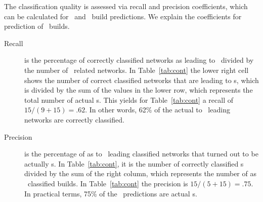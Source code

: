 The classification quality is assessed via recall and precision coefficients,
which can be calculated for \error\ and \ok\ build  predictions. We explain the
coefficients for prediction of \error\ builds.

\begin{description}
\item[Recall] is the percentage of correctly classified networks as leading to
\error\ divided by the number of \error\ related networks. In
Table~\ref{tab:cont} the lower right cell shows the number of correct classified
networks that are leading to \error s, which is divided by the sum of the values
in the lower row, which represents the total number of actual \error s. This
yields for Table~\ref{tab:cont} a recall of $15/(9+15)=.62$. In other words,
62\% of the actual to \error\ leading networks are correctly classified.
 
\item[Precision] is the percentage of as to \error\ leading classified networks
that turned out to be actually \error s. In Table~\ref{tab:cont}, it is the
number of correctly classified \error s divided by the sum of the right column,
which represents the number of as \error\ classified builds. In
Table~\ref{tab:cont} the precision is $15/(5+15)=.75$. In practical terms, 75\%
of the \error\ predictions are actual \error s.
\end{description}





